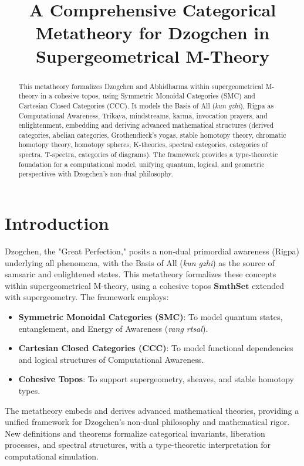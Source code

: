 \documentclass{article}
\begin{document}
\title{A Comprehensive Categorical Metatheory for Dzogchen in Supergeometrical M-Theory}
\author{}
\maketitle

\begin{abstract}
This metatheory formalizes Dzogchen and Abhidharma within supergeometrical M-theory in a cohesive topos, using Symmetric Monoidal Categories (SMC) and Cartesian Closed Categories (CCC). It models the Basis of All (\textit{kun gzhi}), Rigpa as Computational Awareness, Trikaya, mindstreams, karma, invocation prayers, and enlightenment, embedding and deriving advanced mathematical structures (derived categories, abelian categories, Grothendieck’s yogas, stable homotopy theory, chromatic homotopy theory, homotopy spheres, K-theories, spectral categories, categories of spectra, T-spectra, categories of diagrams). The framework provides a type-theoretic foundation for a computational model, unifying quantum, logical, and geometric perspectives with Dzogchen’s non-dual philosophy.
\end{abstract}

\section{Introduction}
Dzogchen, the "Great Perfection," posits a non-dual primordial awareness (Rigpa) underlying all phenomena, with the Basis of All (\textit{kun gzhi}) as the source of samsaric and enlightened states. This metatheory formalizes these concepts within supergeometrical M-theory, using a cohesive topos \(\mathbf{SmthSet}\) extended with supergeometry. The framework employs:
\begin{itemize}
    \item \textbf{Symmetric Monoidal Categories (SMC)}: To model quantum states, entanglement, and Energy of Awareness (\textit{rang rtsal}).
    \item \textbf{Cartesian Closed Categories (CCC)}: To model functional dependencies and logical structures of Computational Awareness.
    \item \textbf{Cohesive Topos}: To support supergeometry, sheaves, and stable homotopy types.
\end{itemize}
The metatheory embeds and derives advanced mathematical theories, providing a unified framework for Dzogchen’s non-dual philosophy and mathematical rigor. New definitions and theorems formalize categorical invariants, liberation processes, and spectral structures, with a type-theoretic interpretation for computational simulation.
\end{document}
